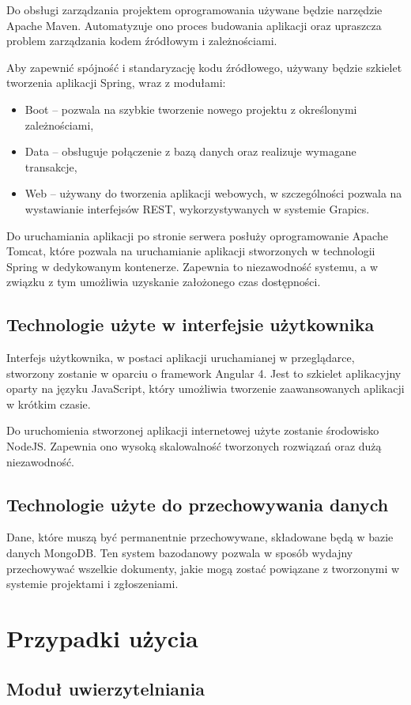 \documentclass[12pt, oneside, final]{report}
\begin{document}
Do obsługi zarządzania projektem oprogramowania używane będzie narzędzie Apache Maven. Automatyzuje ono proces budowania aplikacji oraz upraszcza problem zarządzania kodem źródłowym i zależnościami.

Aby zapewnić spójność i standaryzację kodu źródłowego, używany będzie szkielet tworzenia aplikacji Spring, wraz z modułami:
\begin{itemize}
	\item Boot -- pozwala na szybkie tworzenie nowego projektu z określonymi zależnościami,
	\item Data -- obsługuje połączenie z bazą danych oraz realizuje wymagane transakcje,
	\item Web -- używany do tworzenia aplikacji webowych, w szczególności pozwala na wystawianie interfejsów REST, wykorzystywanych w systemie Grapics.
\end{itemize}
Do uruchamiania aplikacji po stronie serwera posłuży oprogramowanie Apache Tomcat, które pozwala na uruchamianie aplikacji stworzonych w technologii Spring w dedykowanym kontenerze. Zapewnia to niezawodność systemu, a w związku z tym umożliwia uzyskanie założonego czas dostępności.

\section{Technologie użyte w interfejsie użytkownika}
Interfejs użytkownika, w postaci aplikacji uruchamianej w przeglądarce, stworzony zostanie w oparciu o framework Angular 4. Jest to szkielet aplikacyjny oparty na języku JavaScript, który umożliwia tworzenie zaawansowanych aplikacji w krótkim czasie. 

Do uruchomienia stworzonej aplikacji internetowej użyte zostanie środowisko NodeJS. Zapewnia ono wysoką skalowalność tworzonych rozwiązań oraz dużą niezawodność.
\section{Technologie użyte do przechowywania danych}
Dane, które muszą być permanentnie przechowywane, składowane będą w bazie danych MongoDB. Ten system bazodanowy pozwala w sposób wydajny przechowywać wszelkie dokumenty, jakie mogą zostać powiązane z tworzonymi w systemie projektami i zgłoszeniami.
\chapter{Przypadki użycia}
\section{Moduł uwierzytelniania}

\end{document}
